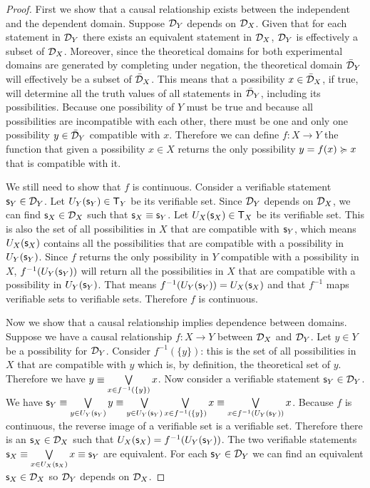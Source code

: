 \documentclass[11pt,letterpaper,fleqn]{memoir} %
\begin{document}
\begin{mathSection}
\begin{thrm}
	\end{thrm}
	\begin{proof}
		First we show that a causal relationship exists between the independent and the dependent domain. Suppose $\mathcal{D}_Y$ depends on $\mathcal{D}_X$. Given that for each statement in $\mathcal{D}_Y$ there exists an equivalent statement in $\mathcal{D}_X$, $\mathcal{D}_Y$ is effectively a subset of $\mathcal{D}_X$. Moreover, since the theoretical domains for both experimental domains are generated by completing under negation, the theoretical domain $\bar{\mathcal{D}}_Y$ will effectively be a subset of $\bar{\mathcal{D}}_X$. This means that a possibility $x \in \bar{\mathcal{D}}_X$, if true, will determine all the truth values of  all statements in $\bar{\mathcal{D}}_Y$, including its possibilities. Because one possibility of $Y$ must be true and because all possibilities are incompatible with each other, there must be one and only one possibility $y \in \bar{\mathcal{D}}_Y$ compatible with $x$. Therefore we can define $f : X \to Y$ the function that given a possibility $x \in X$ returns the only possibility $y=f(x) \succcurlyeq x$ that is compatible with it.
		
		We still need to show that $f$ is continuous. Consider a verifiable statement $\mathsf{s}_Y \in \mathcal{D}_Y$. Let $U_Y(\mathsf{s}_Y) \in \mathsf{T}_Y$ be its verifiable set. Since $\mathcal{D}_Y$ depends on $\mathcal{D}_X$, we can find $\mathsf{s}_X \in \mathcal{D}_X$ such that $\mathsf{s}_X \equiv \mathsf{s}_Y$. Let $U_X(\mathsf{s}_X) \in \mathsf{T}_X$ be its verifiable set. This is also the set of all possibilities in $X$ that are compatible with $\mathsf{s}_Y$, which means $U_X(\mathsf{s}_X)$ contains all the possibilities that are compatible with a possibility in $U_Y(\mathsf{s}_Y)$. Since $f$ returns the only possibility in $Y$ compatible with a possibility in $X$, $f^{-1}(U_Y(\mathsf{s}_Y))$ will return all the possibilities in $X$ that are compatible with a possibility in $U_Y(\mathsf{s}_Y)$. That means $f^{-1}(U_Y(\mathsf{s}_Y)) = U_X(\mathsf{s}_X)$ and that $f^{-1}$ maps verifiable sets to verifiable sets. Therefore $f$ is continuous.
		
		Now we show that a causal relationship implies dependence between domains. Suppose we have a causal relationship $f: X \to Y$ between $\mathcal{D}_X$ and $\mathcal{D}_Y$. Let $y \in Y$ be a possibility for $\mathcal{D}_Y$. Consider  $f^{-1}(\{y\})$: this is the set of all possibilities in $X$ that are compatible with $y$ which is, by definition, the theoretical set of $y$. Therefore we have $y \equiv \bigvee\limits_{x \in f^{-1}(\{y\})} x$. Now consider a verifiable statement $\mathsf{s}_Y \in \mathcal{D}_Y$. We have $\mathsf{s}_Y \equiv \bigvee\limits_{y \in U_Y(\mathsf{s}_Y)} y \equiv \bigvee\limits_{y \in U_Y(\mathsf{s}_Y)} \bigvee\limits_{x \in f^{-1}(\{y\})} x \equiv \bigvee\limits_{x \in f^{-1}(U_Y(\mathsf{s}_Y))} x$. Because $f$ is continuous, the reverse image of a verifiable set is a verifiable set. Therefore there is an $\mathsf{s}_X \in \mathcal{D}_X$ such that $U_X(\mathsf{s}_X) = f^{-1}(U_Y(\mathsf{s}_Y))$. The two verifiable statements $\mathsf{s}_X \equiv \bigvee\limits_{x \in U_X(\mathsf{s}_X)} x \equiv \mathsf{s}_Y$ are equivalent. For each $\mathsf{s}_Y \in \mathcal{D}_Y$ we can find an equivalent $\mathsf{s}_X \in \mathcal{D}_X$ so $\mathcal{D}_Y$ depends on $\mathcal{D}_X$.
	\end{proof}


\end{mathSection}
\end{document}
